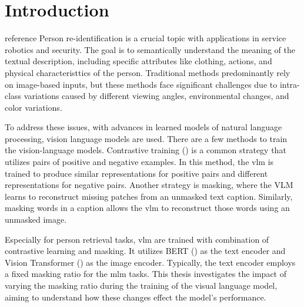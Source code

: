 \chapter{Introduction}
{\color{red} reference}
Person re-identification is a crucial topic with applications in service robotics and security. The goal is to semantically understand the meaning of the textual description, including specific attributes like clothing, actions, and physical characteristtics of the person. Traditional methods predominantly rely on image-based inputs, but these methods face significant challenges due to intra-class variations caused by different viewing angles, environmental changes, and color variations.

To address these issues, with advances in learned models of natural language processing, vision language models are used. There are a few methods to train the vision-language models. 
Contrastive training (\cite{khosla2021supervisedcontrastivelearning}) is a common strategy that utilizes pairs of positive and negative examples. In this method, the \acrfull{vlm} is trained to produce similar representations for positive pairs and different representations for negative pairs. Another strategy is masking, where the VLM learns to reconstruct missing patches from an unmasked text caption. Similarly, masking words in a caption allows the \acrshort{vlm} to reconstruct those words using an unmasked image.


Especially for person retrieval tasks, \acrshort{vlm} are trained with combination of contrastive learning and masking. It utilizes BERT (\cite{devlin2018bert}) as the text encoder and Vision Transformer (\cite{dosovitskiy2021image}) as the image encoder. Typically, the text encoder employs a fixed masking ratio for the \acrfull{mlm} tasks. This thesis investigates the impact of varying the masking ratio during the training of the visual language model, aiming to understand how these changes effect the model's performance.


